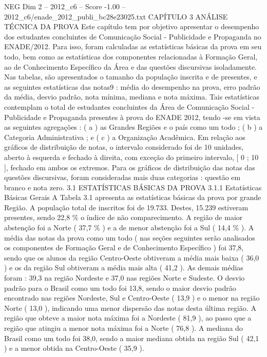 \begin{textsample}{NEG Dim 2 – 2012\_c6 – Score -1.00 – 2012\_c6/enade\_2012\_publi\_bc28e23025.txt}  \label{ex:f2_neg_189}
CAPÍTULO 3 ANÁLISE TÉCNICA DA PROVA Este capítulo tem por objetivo apresentar o desempenho dos estudantes concluintes de Comunicação Social - Publicidade e Propaganda no ENADE/2012.
Para isso, foram calculadas as estatísticas básicas da prova em seu todo, bem como as estatísticas dos componentes relacionadas à Formação Geral, ao de Conhecimento Específico da Área e das questões discursivas isoladamente.
Nas tabelas, são apresentados o tamanho da população inscrita e de presentes, e as seguintes estatísticas das notas9 : média do desempenho na prova, erro padrão da média, desvio padrão, nota mínima, mediana e nota máxima.
Tais estatísticas contemplam o total de estudantes concluintes da Área de Comunicação Social - Publicidade e Propaganda presentes à prova do ENADE 2012, tendo -se em vista as seguintes agregações : ( a ) as Grandes Regiões e o país como um todo ; ( b ) a Categoria Administrativa ; e ( c ) a Organização Acadêmica.
Em relação aos gráficos de distribuição de notas, o intervalo considerado foi de 10 unidades, aberto à esquerda e fechado à direita, com exceção do primeiro intervalo, [ 0 ; 10 ], fechado em ambos os extremos.
Para os gráficos de distribuição das notas das questões discursivas, foram consideradas mais duas categorias : questão em branco e nota zero. 3.1 ESTATÍSTICAS BÁSICAS DA PROVA 3.1.1 Estatísticas Básicas Gerais A Tabela 3.1 apresenta as estatísticas básicas da prova por grande Região.
A população total de inscritos foi de 19.733.
Destes, 15.239 estiveram presentes, sendo 22,8 \% o índice de não comparecimento.
A região de maior abstenção foi a Norte ( 37,7 \% ) e a de menor abstenção foi a Sul ( 14,4 \% ).
A média das notas da prova como um todo ( nas seções seguintes serão analisados os componentes de Formação Geral e de Conhecimento Específico ) foi 37,8, sendo que os alunos da região Centro-Oeste obtiveram a média mais baixa ( 36,0 ) e os da região Sul obtiveram a média mais alta ( 41,2 ).
As demais médias foram : 39,3 na região Nordeste e 37,0 nas regiões Norte e Sudeste.
O desvio padrão para o Brasil como um todo foi 13,8, sendo o maior desvio padrão encontrado nas regiões Nordeste, Sul e Centro-Oeste ( 13,9 ) e o menor na região Norte ( 13,0 ), indicando uma menor dispersão das notas desta última região.
A região que obteve a maior nota máxima foi a Nordeste ( 81,9 ), ao passo que a região que atingiu a menor nota máxima foi a Norte ( 76,8 ).
A mediana do Brasil como um todo foi 38,0, sendo a maior mediana obtida na região Sul ( 42,1 ) e a menor obtida na Centro-Oeste ( 35,9 ).

\end{textsample}
